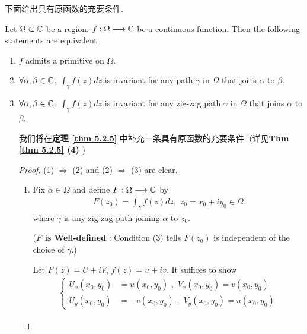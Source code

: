 \vspace{2em}
下面给出具有原函数的充要条件.
\begin{thm}\label{thm 4.1.3}
	Let $\Omega \subset \mathbb{C}$ be a region. $f : \Omega \longrightarrow \mathbb{C}$ be a continuous function. Then the following statements are equivalent:
	\begin{enumerate}
		\item[(1)]$f$ admits a primitive on $\Omega$.
		
		\item[(2)]$\forall \alpha , \beta \in \mathbb{C}$, $\int_{\gamma}{f(z) dz}$ is invariant for any path $\gamma$ in $\Omega$ that joins $\alpha$ to $\beta$.
		
		\item[(3)]$\forall \alpha , \beta \in \mathbb{C}$, $\int_{\gamma}{f(z) dz}$ is invariant for any zig-zag path $\gamma$ in $\Omega$ that joins $\alpha$ to $\beta$.
		
		\vspace{1em}
		\begin{rmk}
			我们将在\textbf{定理 \ref{thm 5.2.5}} 中补充一条具有原函数的充要条件. (详见\textbf{Thm \ref{thm 5.2.5} (4)} )
		\end{rmk}
		
		\vspace{2em}
		\begin{proof}
			(1) $\Rightarrow$ (2) and (2) $\Rightarrow$ (3) are clear.
			\begin{enumerate}
				\item[(3) $\Rightarrow$ (1):]Fix $\alpha \in \Omega$ and define $F : \Omega \longrightarrow \mathbb{C}$ by 
				\begin{align}
					F(z_0) = \int_{\gamma}{f(z) dz} , \,\, z_0 = x_0 + i y_0 \in \Omega
				\end{align}
				where $\gamma$ is any zig-zag path joining $\alpha$ to $z_0$.
				\begin{center}
					(\textbf{$F$ is Well-defined} : Condition (3) tells $F(z_0)$ is independent of the choice of $\gamma$.)
				\end{center}
				
				\vspace{1.5em}
				Let $F(z) = U + i V$, $f(z) = u + i v$. It suffices to show
				\begin{align}
					\begin{cases}
						U_{x}(x_0 , y_0) &= u(x_0 , y_0) \,\, , \,\, V_{x}(x_0 , y_0) = v(x_0 , y_0) \\
						U_{y}(x_0 , y_0) &= -v(x_0 , y_0) \,\, , \,\, V_{y}(x_0 , y_0) = u(x_0 , y_0)
					\end{cases}
				\end{align}
				

\end{enumerate}
\end{proof}
\end{enumerate}
\end{thm}
